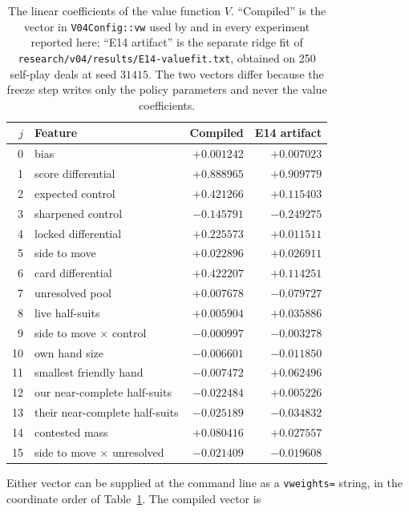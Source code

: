 \begin{table}[ht]
\centering
\caption{The \numValueFeats{} linear coefficients of the value function $V$.
``Compiled'' is the vector in \texttt{V04Config::vw} used by \vfast{} and
\vblock{} in every experiment reported here; ``E14 artifact'' is the separate
ridge fit of \texttt{research/v04/results/E14-valuefit.txt}, obtained on 250
self-play deals at seed $31415$. The two vectors differ because the freeze step
writes only the \numParams{} policy parameters and never the value coefficients.}
\label{tab:valuecoef}
\small
\begin{tabular}{rlrr}
\toprule
$j$ & Feature & Compiled & E14 artifact \\
\midrule
0  & bias                          & $+0.001242$ & $+0.007023$ \\
1  & score differential            & $+0.888965$ & $+0.909779$ \\
2  & expected control              & $+0.421266$ & $+0.115403$ \\
3  & sharpened control             & $-0.145791$ & $-0.249275$ \\
4  & locked differential           & $+0.225573$ & $+0.011511$ \\
5  & side to move                  & $+0.022896$ & $+0.026911$ \\
6  & card differential             & $+0.422207$ & $+0.114251$ \\
7  & unresolved pool               & $+0.007678$ & $-0.079727$ \\
8  & live half-suits               & $+0.005904$ & $+0.035886$ \\
9  & side to move $\times$ control & $-0.000997$ & $-0.003278$ \\
10 & own hand size                 & $-0.006601$ & $-0.011850$ \\
11 & smallest friendly hand        & $-0.007472$ & $+0.062496$ \\
12 & our near-complete half-suits  & $-0.022484$ & $+0.005226$ \\
13 & their near-complete half-suits& $-0.025189$ & $-0.034832$ \\
14 & contested mass                & $+0.080416$ & $+0.027557$ \\
15 & side to move $\times$ unresolved & $-0.021409$ & $-0.019608$ \\
\bottomrule
\end{tabular}
\end{table}

Either vector can be supplied at the command line as a \texttt{vweights=} string,
in the coordinate order of Table~\ref{tab:valuecoef}. The compiled vector is

